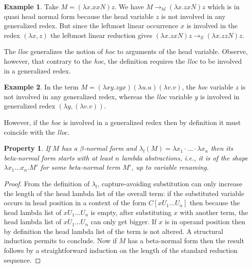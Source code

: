 \documentclass[xchauthor,chkrefs,GCNS,amsmath,amsthm,rotating,leaveRGB]{tcsg}
\theoremstyle{plain}
\newtheorem{property}[theorem]{Property}
\theoremstyle{definition}
\newtheorem{example}{Example}[section]
\newcommand{\hlred}{\rightarrow_{hl}}
\newcommand{\llred}{\rightarrow_{ll}}
\begin{document}
\begin{example}
Take $M = (\lambda x. x x N) z$. We have $M \hlred (\lambda x. z x N) z$
which is in quasi head normal form because the head variable $z$ is not
involved in any generalized redex. But since the leftmost linear occurrence
$x$ is involved in the redex $(\lambda x, z)$ the leftmost linear reduction
gives $(\lambda x. z x N) z \llred (\lambda x. z z N) z$.
\end{example}

The \emph{lloc} generalizes the notion of \emph{hoc} to arguments of the head
variable. Observe, however, that contrary to the \emph{hoc}, the definition
requires the \emph{lloc} to be involved in a generalized redex.

\begin{example}
In the term $M = (\lambda x y . z y x) (\lambda u . u) (\lambda v . v)$, the
\emph{hoc} variable $z$ is not involved in any generalized redex, whereas the
\emph{lloc} variable $y$ is involved in generalized redex $(\lambda y,
(\lambda v.v))$.
\end{example}

However, if the \emph{hoc} is involved in a generalized redex then
by definition it must coincide with the \emph{lloc}.

\begin{property}
If $M$ has a $\beta $-normal form and $\lambda _{l}(M) = \lambda x_{1} \cdot
\ldots \cdot \lambda x_{n}$ then its beta-normal form starts with at least
$n$ lambda abstractions, \textit{i.e.}, it is of the shape $\lambda x_{1}
\ldots x_{n} . M'$ for some beta-normal term $M'$, up to variable renaming.
\end{property}

\begin{proof}
From the definition of $\lambda _{l}$, capture-avoiding substitution can only
increase the length of the head lambda list of the overall term: if the
substituted variable occurs in head position in a context of the form $C[x
U_{1} \ldots U_{n}]$ then because the head lambda list of $x U_{1} \ldots
U_{n}$ is empty, after substituting $x$ with another term, the head lambda
list of $x U_{1} \ldots U_{n}$ can only get bigger. If $x$ is in operand
position then by definition the head lambda list of the term is not altered.
A structural induction permits to conclude. Now if $M$ has a beta-normal form
then the result follows by a straightforward induction on the length of the
standard reduction sequence.
\end{proof}
\end{document}
